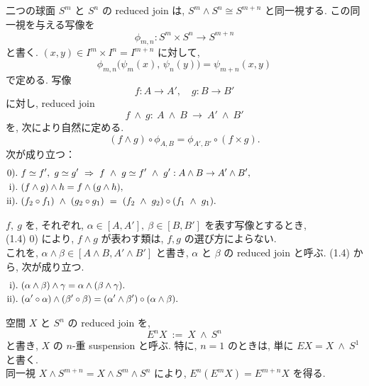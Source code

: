 \documentclass[12pt, leqno]{ltjsarticle}
\newcommand{\shrink}{\phi}
\newcommand{\Ex}{E}        %
\numberwithin{equation}{section}
\theoremstyle{plain}
\theoremstyle{definition}
\theoremstyle{remark}
\begin{document}
二つの球面 $S^m$ と $S^n$ の reduced join は,
$S^m\wedge S^n\cong S^{m+n}$ と同一視する.
この同一視を与える写像を
\begin{equation}
\shrink_{m,n}:S^m\times S^n\longrightarrow S^{m+n}
\end{equation}
と書く. $(x,y)\in I^m\times I^n=I^{m+n}$ に対して,
\[
\shrink_{m,n}\bigl(\psi_m(x),\,\psi_n(y)\bigr)=\psi_{m+n}(x,y)
\]
で定める.
写像
\[
f:A\to A',\quad g:B\to B'
\]
に対し, reduced join
\[
f\ \wedge \ g:\ A\ \wedge\ B\ \longrightarrow\ A'\ \wedge\ B'
\]
を, 次により自然に定める.
\[
(f\wedge g)\circ \phi_{A,B} = \phi_{A',B'}\circ (f\times g).
\]
次が成り立つ：
\begin{equation}
\raisetag{3ex}
\begin{aligned}[t]
\text{0).}\ & f\simeq f',\ g\simeq g' \ \Rightarrow\ 
f\ \wedge\ g\simeq f'\ \wedge\ g': A\wedge B\to A'\wedge B',
\qquad\qquad\qquad\qquad\qquad\qquad\\
\text{i).}\ & (f\wedge g)\wedge h = f\wedge (g\wedge h),\\
\text{ii).}\ & (f_2\circ f_1)\ \wedge\ (g_2\circ g_1)\ 
= \ (f_2\ \wedge\ g_2)\circ(f_1\ \wedge\ g_1).
\end{aligned}
\end{equation}

\(f,\ g\) 
を, それぞれ,
\(\alpha\in[A,A'],\ \beta\in[B,B']\)
を表す写像とするとき,\\
(1.4) 0) により,
\(f\wedge g\) 
が表わす類は, 
\(f,g\) の選び方によらない.\\
これを,
\(\alpha\wedge \beta\in[A\wedge B, A'\wedge B']\)
と書き, \(\alpha\) と \(\beta\) の
reduced join と呼ぶ.
(1.4) から, 次が成り立つ.
\begin{equation}
\raisetag{3ex}
\begin{aligned}[t]
  \text{i).}\ & (\alpha\wedge\beta)\wedge\gamma 
  = \alpha\wedge(\beta\wedge\gamma).\\
  \text{ii).}\ & (\alpha'\circ\alpha)\wedge(\beta'\circ\beta)
  = (\alpha'\wedge\beta')\circ(\alpha\wedge\beta).
  \qquad\qquad\qquad\qquad\qquad\qquad\qquad\qquad\qquad\qquad
\end{aligned}
\end{equation}

空間 $X$ と $S^n$ の reduced join を,
\[
\Ex^n X\ :=\ X\ \wedge\ S^n
\]
と書き, $X$ の $n$-重 suspension と呼ぶ. 
特に, $n=1$ のときは, 単に $\Ex X=X\ \wedge\ S^1$ と書く. \\
同一視 \(X\wedge S^{m+n} = X\wedge S^m\wedge S^n\)
により, 
\(E^n(E^m X) = E^{m+n} X\) を得る.
\end{document}
